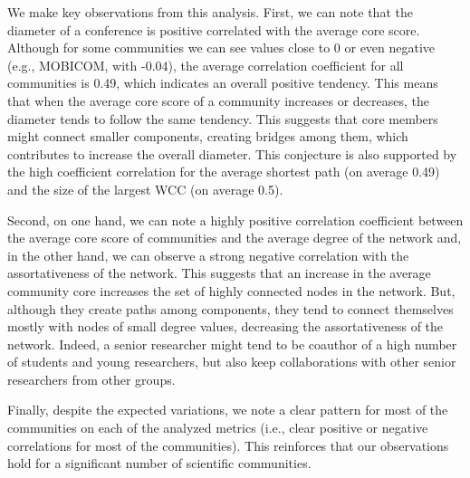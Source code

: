 We make key observations from this analysis. First, we can note that the diameter of a conference is positive correlated with the average core score. Although for some communities
we can see values close to 0 or even negative (e.g., MOBICOM, with -0.04), the average correlation coefficient for all communities is 0.49, which indicates an overall
positive tendency. This means that when the average core score of a community increases or decreases, the diameter tends to follow the same tendency. This suggests that core 
members might connect smaller components, creating bridges among them, which contributes to increase the overall diameter. This conjecture is also supported by the high coefficient
correlation for the average shortest path (on average 0.49) and the size of the largest WCC (on average 0.5).

Second, on one hand, we can note a highly positive correlation coefficient between the average core score of communities and the average degree of the network and, in the
other hand, we can 
observe a strong negative correlation with the assortativeness of the network. This suggests that an increase in the average community core increases the set of highly connected
nodes in the network. But, although they create paths among components, they tend to connect themselves mostly with nodes of small degree values, decreasing the assortativeness of the
network. Indeed, a senior researcher might tend to be coauthor of a high number of students and young researchers, but also keep collaborations with other senior researchers from
other groups.

Finally, despite the expected variations, we note a clear pattern for most of the communities on each of the analyzed metrics (i.e., clear positive or negative correlations for most of the
communities). This reinforces that our observations hold for a significant number of scientific communities. 





